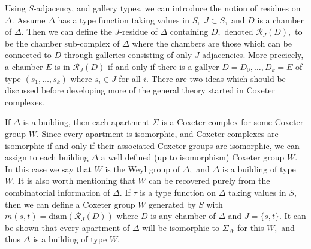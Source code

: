\documentclass[class=book, crop=false,12 pt]{standalone}
\begin{document}
Using $S$-adjacency, and gallery types, we can introduce the notion of residues on $\Delta.$ Assume $\Delta$ has a type function taking values in $S,$ $J\subset S,$ and $D$ is a chamber of $\Delta.$ Then we can define the $J$-residue of $\Delta$ containing $D,$ denoted $\mathcal{R}_J(D),$ to be the chamber sub-complex of $\Delta$ where the chambers are those which can be connected to $D$ through galleries consisting of only $J$-adjacencies. More precicely, a chamber $E$ is in $\mathcal{R}_J(D)$ if and only if there is a gallyer $D=D_0,\dots,D_k=E$ of type $(s_1,\dots,s_k)$ where $s_i\in J$ for all $i.$ There are two ideas which should be discussed before developing more of the general theory started in Coxeter complexes.

If $\Delta$ is a building, then each apartment $\Sigma$ is a Coxeter complex for some Coxeter group $W.$ Since every apartment is isomorphic, and Coxeter complexes are isomorphic if and only if their associated Coxeter groups are isomorphic, we can assign to each building $\Delta$ a well defined (up to isomorphism) Coxeter group $W.$ In this case we say that $W$ is the Weyl group of $\Delta,$ and $\Delta$ is a building of type $W.$ It is also worth mentioning that $W$ can be recovered purely from the combinatorial information of $\Delta.$ If $\tau$ is a type function on $\Delta$ taking values in $S,$ then we can define a Coxeter group $W$ generated by $S$ with $m(s,t)=\mathrm{diam}(\mathcal{R}_J(D))$ where $D$ is any chamber of $\Delta$ and $J=\{s,t\}.$ It can be shown that every apartment of $\Delta$ will be isomorphic to $\Sigma_W$ for this $W,$ and thus $\Delta$ is a building of type $W.$
\end{document}
